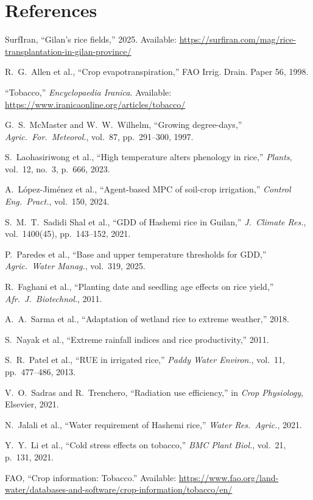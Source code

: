 \documentclass[12pt,a4paper]{article}
\begin{document}
\section*{References}

\begin{enumerate}[label={[\arabic*]}, leftmargin=*]
\item SurfIran, ``Gilan's rice fields,'' 2025. Available: \url{https://surfiran.com/mag/rice-transplantation-in-gilan-province/}
\item R.~G.~Allen et al., ``Crop evapotranspiration,'' FAO Irrig. Drain. Paper 56, 1998.
\item ``Tobacco,'' \emph{Encyclopaedia Iranica}. Available: \url{https://www.iranicaonline.org/articles/tobacco/}
\item G.~S.~McMaster and W.~W.~Wilhelm, ``Growing degree-days,'' \emph{Agric.\ For.\ Meteorol.}, vol.~87, pp.~291--300, 1997.
\item S.~Laohasiriwong et al., ``High temperature alters phenology in rice,'' \emph{Plants}, vol.~12, no.~3, p.~666, 2023.
\item A.~L\'{o}pez-Jim\'{e}nez et al., ``Agent-based MPC of soil-crop irrigation,'' \emph{Control Eng.\ Pract.}, vol.~150, 2024.
\item S.~M.~T.~Sadidi Shal et al., ``GDD of Hashemi rice in Guilan,'' \emph{J.\ Climate Res.}, vol.~1400(45), pp.~143--152, 2021.
\item P.~Paredes et al., ``Base and upper temperature thresholds for GDD,'' \emph{Agric.\ Water Manag.}, vol.~319, 2025.
\item R.~Faghani et al., ``Planting date and seedling age effects on rice yield,'' \emph{Afr.\ J.\ Biotechnol.}, 2011.
\item A.~A.~Sarma et al., ``Adaptation of wetland rice to extreme weather,'' 2018.
\item S.~Nayak et al., ``Extreme rainfall indices and rice productivity,'' 2011.
\item S.~R.~Patel et al., ``RUE in irrigated rice,'' \emph{Paddy Water Environ.}, vol.~11, pp.~477--486, 2013.
\item V.~O.~Sadras and R.~Trenchero, ``Radiation use efficiency,'' in \emph{Crop Physiology}, Elsevier, 2021.
\item N.~Jalali et al., ``Water requirement of Hashemi rice,'' \emph{Water Res.\ Agric.}, 2021.
\item Y.~Y.~Li et al., ``Cold stress effects on tobacco,'' \emph{BMC Plant Biol.}, vol.~21, p.~131, 2021.
\item FAO, ``Crop information: Tobacco.'' Available: \url{https://www.fao.org/land-water/databases-and-software/crop-information/tobacco/en/}

\end{enumerate}
\end{document}
